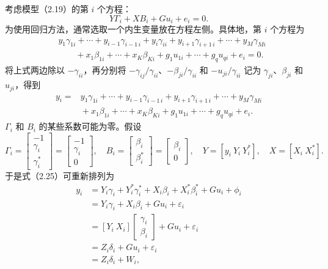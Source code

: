 考虑模型（2.19）的第 $i$ 个方程：
\begin{equation}
Y\Gamma_i+XB_i+Gu_i+e_i=0.
\tag{2.24}
\end{equation}
为使用回归方法，通常选取一个内生变量放在方程左侧。具体地，第 $i$ 个方程为
\[
\begin{aligned}
&y_1\gamma_{1i}+\cdots+y_{i-1}\gamma_{i-1\,i}
+y_i\gamma_{ii}+y_{i+1}\gamma_{i+1\,i}+\cdots+y_M\gamma_{Mi}\\
&\qquad+x_1\beta_{1i}+\cdots+x_K\beta_{Ki}
+g_1u_{1i}+\cdots+g_qu_{qi}+e_i=0.
\end{aligned}
\]
将上式两边除以 $-\gamma_{ii}$，再分别将 $-\gamma_{ij}/\gamma_{ii}$、$-\beta_{ji}/\gamma_{ii}$ 和 $-u_{ji}/\gamma_{ii}$ 记为 $\gamma_{ji}$、$\beta_{ji}$ 和 $u_{ji}$，得到
\begin{equation}
\begin{aligned}
y_i={}&y_1\gamma_{1i}+\cdots+y_{i-1}\gamma_{i-1\,i}
+y_{i+1}\gamma_{i+1\,i}+\cdots+y_M\gamma_{Mi}\\
&{}+x_1\beta_{1i}+\cdots+x_K\beta_{Ki}
+g_1u_{1i}+\cdots+g_qu_{qi}+e_i.
\end{aligned}\tag{2.25}
\end{equation}
$\Gamma_i$ 和 $B_i$ 的某些系数可能为零。假设
\[
\Gamma_i=
\begin{bmatrix}-1\\\gamma_i\\\gamma_i^*\end{bmatrix}
=\begin{bmatrix}-1\\\gamma_i\\0\end{bmatrix},
\quad
B_i=\begin{bmatrix}\beta_i\\\beta_i^*\end{bmatrix}
=\begin{bmatrix}\beta_i\\0\end{bmatrix},
\quad Y=[y_i\ Y_i\ Y_i^*],\quad X=[X_i\ X_i^*].
\]
于是式（2.25）可重新排列为
\begin{equation}
\begin{aligned}
y_i&=Y_i\gamma_i+Y_i^*\gamma_i^*+X_i\beta_i+X_i^*\beta_i^*+Gu_i+\phi_i\\
&=Y_i\gamma_i+X_i\beta_i+Gu_i+\varepsilon_i\\
&=[Y_i\ X_i]\begin{bmatrix}\gamma_i\\\beta_i\end{bmatrix}+Gu_i+\varepsilon_i\\
&=Z_i\delta_i+Gu_i+\varepsilon_i\\
&=Z_i\delta_i+W_i,
\end{aligned}\tag{2.26}
\end{equation}
